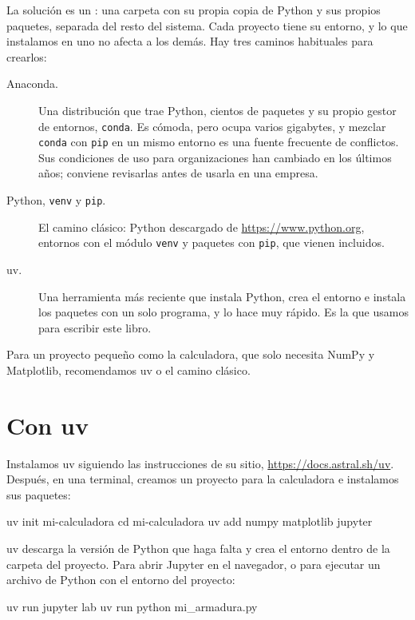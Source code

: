 La solución es un : una carpeta
con su propia copia de Python y sus propios paquetes, separada del resto del
sistema. Cada proyecto tiene su entorno, y lo que instalamos en uno no afecta
a los demás. Hay tres caminos habituales para crearlos:
\begin{description}
  \item[Anaconda.] Una distribución que trae Python, cientos de paquetes y
    su propio gestor de entornos, \texttt{conda}. Es cómoda, pero ocupa
    varios gigabytes, y mezclar \texttt{conda} con \texttt{pip} en un mismo
    entorno es una fuente frecuente de conflictos. Sus condiciones de uso
    para organizaciones han cambiado en los últimos años; conviene revisarlas
    antes de usarla en una empresa.
  \item[Python, \texttt{venv} y \texttt{pip}.] El camino clásico: Python
    descargado de \url{https://www.python.org}, entornos con el módulo
    \texttt{venv} y paquetes con \texttt{pip}, que vienen incluidos.
  \item[uv.] Una herramienta más reciente que instala Python, crea el
    entorno e instala los paquetes con un solo programa, y lo hace muy
    rápido. Es la que usamos para escribir este libro.
\end{description}
Para un proyecto pequeño como la calculadora, que solo necesita NumPy y
Matplotlib, recomendamos uv o el camino clásico.

\section{Con uv}\label{sec:c_uv}

Instalamos uv siguiendo las instrucciones de su sitio,
\url{https://docs.astral.sh/uv}. Después, en una terminal, creamos un
proyecto para la calculadora e instalamos sus paquetes:
\begin{consola}
uv init mi-calculadora
cd mi-calculadora
uv add numpy matplotlib jupyter
\end{consola}
uv descarga la versión de Python que haga falta y crea el entorno dentro de la
carpeta del proyecto. Para abrir Jupyter en el navegador, o para ejecutar un
archivo de Python con el entorno del proyecto:
\begin{consola}
uv run jupyter lab
uv run python mi_armadura.py
\end{consola}

